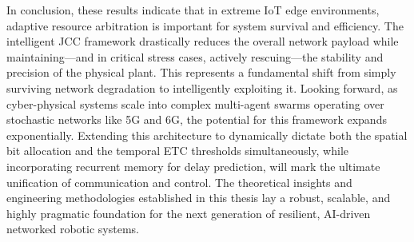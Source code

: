 In conclusion, these results indicate that in extreme IoT edge environments, adaptive resource arbitration is important for system survival and efficiency. 
The intelligent JCC framework drastically reduces the overall network payload while maintaining—and in critical stress cases, actively rescuing—the stability and precision of the physical plant. 
This represents a fundamental shift from simply surviving network degradation to intelligently exploiting it. Looking forward, as cyber-physical systems scale into complex multi-agent swarms operating over stochastic networks like 5G and 6G, the potential for this framework expands exponentially. 
Extending this architecture to dynamically dictate both the spatial bit allocation and the temporal ETC thresholds simultaneously, while incorporating recurrent memory for delay prediction, will mark the ultimate unification of communication and control. 
The theoretical insights and engineering methodologies established in this thesis lay a robust, scalable, and highly pragmatic foundation for the next generation of resilient, AI-driven networked robotic systems.

